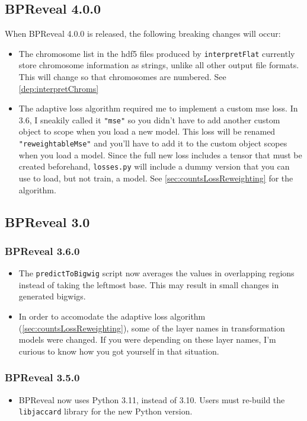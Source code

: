 \documentclass{article}
\begin{document}
\subsection{BPReveal 4.0.0}
When BPReveal 4.0.0 is released, the following breaking changes will occur:
\begin{itemize}
    \item The chromosome list in the hdf5 files produced by \texttt{interpretFlat} currently
        store chromosome information as strings, unlike all other output file formats.
        This will change so that chromosomes are numbered. See \ref{dep:interpretChroms}
    \item The adaptive loss algorithm required me to implement a custom mse loss. In 3.6,
        I sneakily called it \texttt{"mse"} so you didn't have to add another custom object
        to scope when you load a new model. This loss will be renamed \texttt{"reweightableMse"}
        and you'll have to add it to the custom object scopes when you load a model.
        Since the full new loss includes a tensor that must be created beforehand,
        \texttt{losses.py} will include a dummy version that you can use to load, but
        not train, a model. See \ref{sec:countsLossReweighting} for the algorithm.
\end{itemize}

\subsection{BPReveal 3.0}

\subsubsection{BPReveal 3.6.0}
\begin{itemize}
    \item The \texttt{predictToBigwig} script now averages the values in overlapping regions
        instead of taking the leftmost base. This may result in small changes in generated
        bigwigs.
    \item In order to accomodate the adaptive loss algorithm (\ref{sec:countsLossReweighting}),
        some of the layer names in transformation models were changed. If you were depending
        on these layer names, I'm curious to know how you got yourself in that situation.
\end{itemize}

\subsubsection{BPReveal 3.5.0}
\begin{itemize}
    \item BPReveal now uses Python 3.11, instead of 3.10. Users must re-build the
        \texttt{libjaccard} library for the new Python version.
\end{itemize}
\end{document}
